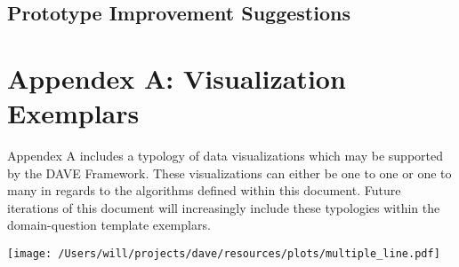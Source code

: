 \documentclass{article}
\begin{document}
\subsection{Prototype Improvement Suggestions}


\section{Appendex A: Visualization Exemplars}
Appendex A includes a typology of data visualizations which may be supported by the DAVE Framework.
These visualizations can either be one to one or one to many in regards to the algorithms defined within this document.
Future iterations of this document will increasingly include these typologies within the domain-question template exemplars.

\begin{figure*}[h]
  \centering
  \begin{floatrow}[3]
    {}
      {}
    \end{floatrow}
\end{figure*}

\begin{figure*}[h]
  \centering
  \begin{floatrow}[3]
    {}
  {\texttt{[image: /Users/will/projects/dave/resources/plots/multiple\_line.pdf]}}
  \end{floatrow}
\end{figure*}
\end{document}
